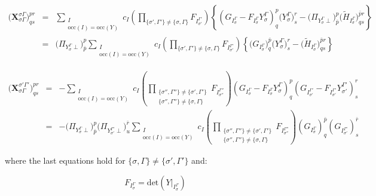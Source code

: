 \documentclass[a4paper,11pt]{article}
\newcommand{\irp}{\ensuremath{\Gamma}}
\newcommand{\irpP}{{\ensuremath{\Gamma'}}}
\newcommand{\irpPP}{{\ensuremath{\Gamma''}}}
\begin{document}
\begin{eqnarray}
  \big( \mathbf{X}_{\sigma \irp}^{\sigma \irp} \big)^{pr}_{qs} &=&
  \sum_{\substack{I\\\text{occ}(I) = \text{occ}(Y)}} c_I
  \left( \prod_{\{\sigma', \irpP\} \ne \{\sigma, \irp\}} F_{I_{\sigma'}^\irpP} \right)
  \left\{ \left( G_{I_\sigma^\irp} - F_{I_\sigma^\irp} Y_\sigma^\irp  \right)^p_q \big( Y_\sigma^\irp \big)^r_s
  - \big( \Pi_{Y_\sigma^\irp \perp} \big)^p_{\bar{p}} \big( \tilde{H}_{I_\sigma^\irp} \big)^{\bar{p}r}_{qs} \right\}\\
  &=&
  \big( \Pi_{Y_\sigma^\irp \perp} \big)^p_{\bar{p}}
  \sum_{\substack{I\\\text{occ}(I) = \text{occ}(Y)}} c_I
  \left( \prod_{\{\sigma', \irpP\} \ne \{\sigma, \irp\}} F_{I_{\sigma'}^\irpP} \right)
  \left\{ \big( G_{I_\sigma^\irp} \big)^{\bar{p}}_q \big( Y_\sigma^\irp \big)^r_s
  - \big( \tilde{H}_{I_\sigma^\irp} \big)^{{\bar{p}}r}_{qs} \right\}
\end{eqnarray}

\begin{eqnarray}
  \big( \mathbf{X}_{\sigma \irp}^{\sigma' \irpP} \big)^{pr}_{qs} &=&
  -%
  \sum_{\substack{I\\\text{occ}(I) = \text{occ}(Y)}} c_I
  \left(
    \prod_{\substack{
        \{\sigma'', \irpPP\} \ne \{\sigma', \irpP\} \\
        \{\sigma'', \irpPP\} \ne \{\sigma , \irp \}}}
    F_{I_{\sigma''}^{\irpPP}} \right)
  \left( G_{I_\sigma^\irp} - F_{I_\sigma^\irp} Y_\sigma^\irp  \right)^p_q
  \left( G_{I_{\sigma'}^\irpP} - F_{I_{\sigma'}^\irpP} Y_{\sigma'}^\irpP \right)^r_s\\
  &=&
  -%
  \big( \Pi_{Y_\sigma^\irp \perp} \big)^p_{\bar{p}}
  \big( \Pi_{Y_{\sigma'}^\irpP \perp} \big)^{\bar{r}}_u
  \sum_{\substack{I\\\text{occ}(I) = \text{occ}(Y)}} c_I
  \left(
    \prod_{\substack{
        \{\sigma'', \irpPP\} \ne \{\sigma', \irpP\} \\
        \{\sigma'', \irpPP\} \ne \{\sigma , \irp \}}}
    F_{I_{\sigma''}^{\irpPP}} \right)
  \left( G_{I_\sigma^\irp}  \right)^{\bar{p}}_q
  \left( G_{I_{\sigma'}^\irpP} \right)^{\bar{r}}_s
\end{eqnarray}

where the last equations hold for ${\{\sigma,\irp\} \ne \{\sigma',\irpP\}}$ and:

\begin{equation}
  F_{I_\sigma^\irp} = \text{det} \left( Y\big|_{I_\sigma^\irp} \right)
\end{equation}
\end{document}
